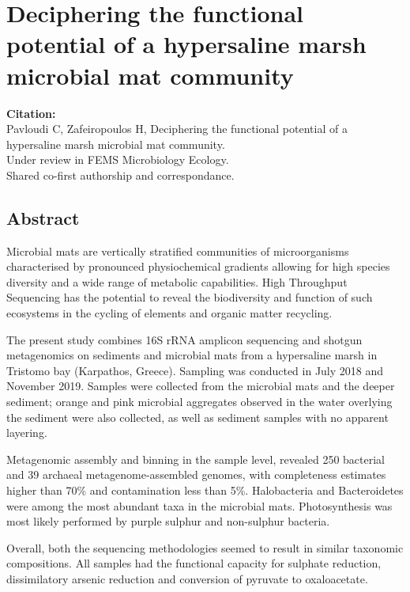 % 
% 

\chapter{
   Deciphering the functional potential of a hypersaline marsh microbial mat community
}
\label{publ:swamp}

\textbf{Citation:} \\ 
   Pavloudi C, Zafeiropoulos H, 
   Deciphering the functional potential of a hypersaline marsh microbial mat community.\\
   Under review in FEMS Microbiology Ecology. \\ 
   Shared co-first authorship and correspondance.


\section{Abstract}

   Microbial mats are vertically stratified communities of microorganisms characterised by 
   pronounced physiochemical gradients allowing for high species diversity 
   and a wide range of metabolic capabilities. 
   High Throughput Sequencing has the potential to reveal the biodiversity and function of such ecosystems 
   in the cycling of elements and organic matter recycling.

   The present study combines 16S rRNA amplicon sequencing and shotgun metagenomics 
   on sediments and microbial mats from a hypersaline marsh in Tristomo bay 
   (Karpathos, Greece). 
   Sampling was conducted in July 2018 and November 2019. 
   Samples were collected from the microbial mats and the deeper sediment; 
   orange and pink microbial aggregates observed in the water overlying the 
   sediment were also collected, as well as sediment samples with no apparent layering.

   Metagenomic assembly and binning in the sample level, revealed 250 bacterial 
   and 39 archaeal metagenome-assembled genomes, 
   with completeness estimates higher than 70\%  and contamination less than 5\%. 
   Halobacteria and Bacteroidetes were among the most abundant taxa in the microbial mats. 
   Photosynthesis was most likely performed by purple sulphur and non-sulphur bacteria. 
   
   Overall, both the sequencing methodologies seemed to result in similar 
   taxonomic compositions. 
   All samples had the functional capacity for sulphate reduction, 
   dissimilatory arsenic reduction and conversion of pyruvate to oxaloacetate. 


